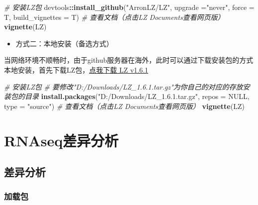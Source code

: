 \documentclass[
]{book}
\newenvironment{Shaded}{\begin{snugshade}}{\end{snugshade}}
\newcommand{\AttributeTok}[1]{\textcolor[rgb]{0.13,0.29,0.53}{#1}}
\newcommand{\CommentTok}[1]{\textcolor[rgb]{0.56,0.35,0.01}{\textit{#1}}}
\newcommand{\ConstantTok}[1]{\textcolor[rgb]{0.56,0.35,0.01}{#1}}
\newcommand{\FunctionTok}[1]{\textcolor[rgb]{0.13,0.29,0.53}{\textbf{#1}}}
\newcommand{\NormalTok}[1]{#1}
\newcommand{\SpecialCharTok}[1]{\textcolor[rgb]{0.81,0.36,0.00}{\textbf{#1}}}
\newcommand{\StringTok}[1]{\textcolor[rgb]{0.31,0.60,0.02}{#1}}
\providecommand{\tightlist}{%
  \setlength{\itemsep}{0pt}\setlength{\parskip}{0pt}}
\begin{document}
\begin{Shaded}
\begin{Highlighting}[]
\CommentTok{\# 安装LZ包}
\NormalTok{devtools}\SpecialCharTok{::}\FunctionTok{install\_github}\NormalTok{(}\StringTok{"ArronLZ/LZ"}\NormalTok{, }\AttributeTok{upgrade =}\StringTok{"never"}\NormalTok{, }\AttributeTok{force =}\NormalTok{ T, }
                         \AttributeTok{build\_vignettes =}\NormalTok{ T)}
\CommentTok{\# 查看文档（点击LZ Documents查看网页版）}
\FunctionTok{vignette}\NormalTok{(}\StringTok{\textquotesingle{}LZ\textquotesingle{}}\NormalTok{)}
\end{Highlighting}
\end{Shaded}

\begin{itemize}
\tightlist
\item
  方式二：本地安装（备选方式）
\end{itemize}

当网络环境不顺畅时，由于github服务器在海外，此时可以通过下载安装包的方式本地安装，首先下载LZ包，\href{https://github.com/ArronLZ/LZ/releases/download/v1.6.1/LZ_1.6.1.tar.gz}{点我下载 LZ v1.6.1}

\begin{Shaded}
\begin{Highlighting}[]
\CommentTok{\# 安装LZ包}
\CommentTok{\# 要修改"D:/Downloads/LZ\_1.6.1.tar.gz"为你自己的对应的存放安装包的目录}
\FunctionTok{install.packages}\NormalTok{(}\StringTok{"D:/Downloads/LZ\_1.6.1.tar.gz"}\NormalTok{, }\AttributeTok{repos =} \ConstantTok{NULL}\NormalTok{, }\AttributeTok{type =} \StringTok{"source"}\NormalTok{)}
\CommentTok{\# 查看文档（点击LZ Documents查看网页版）}
\FunctionTok{vignette}\NormalTok{(}\StringTok{\textquotesingle{}LZ\textquotesingle{}}\NormalTok{)}
\end{Highlighting}
\end{Shaded}

\chapter{RNAseq差异分析}\label{deg}

\section{差异分析}\label{deg-mian}

\subsection{加载包}\label{ux52a0ux8f7dux5305}
\end{document}
